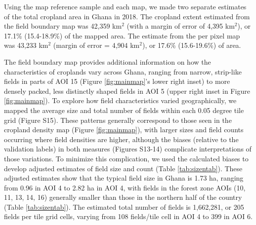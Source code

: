 \documentclass[11pt,a4paper]{article}
\begin{document}
Using the map reference sample and each map, we made two separate
estimates of the total cropland area in Ghana in 2018. The cropland
extent estimated from the field boundary map was 42,359 km\(^2\) (with a
margin of error of 4,395 km\(^2\)), or 17.1\% (15.4-18.9\%) of the
mapped area. The estimate from the per pixel map was 43,233 km\(^2\)
(margin of error = 4,904 km\(^2\)), or 17.6\% (15.6-19.6\%) of area.

The field boundary map provides additional information on how the
characteristics of croplands vary across Ghana, ranging from narrow,
strip-like fields in parts of AOI 15 (Figure \ref{fig:mainmap}'s lower
right inset) to more densely packed, less distinctly shaped fields in
AOI 5 (upper right inset in Figure \ref{fig:mainmap}). To explore how
field characteristics varied geographically, we mapped the average size
and total number of fields within each 0.05 degree tile grid (Figure
S15). These patterns generally correspond to those seen in the cropland
density map (Figure \ref{fig:mainmap}), with larger sizes and field
counts occurring where field densities are higher, although the biases
(relative to the validation labels) in both measures (Figures S13-14)
complicate interpretations of those variations. To minimize this
complication, we used the calculated biases to develop adjusted
estimates of field size and count (Table \ref{tab:sizentab}). These
adjusted estimates show that the typical field size in Ghana is 1.73 ha,
ranging from 0.96 in AOI 4 to 2.82 ha in AOI 4, with fields in the
forest zone AOIs (10, 11, 13, 14, 16) generally smaller than those in
the northern half of the country (Table \ref{tab:sizentab}). The
estimated total number of fields is 1,662,281, or 205 fields per tile
grid cells, varying from 108 fields/tile cell in AOI 4 to 399 in AOI 6.
\end{document}
